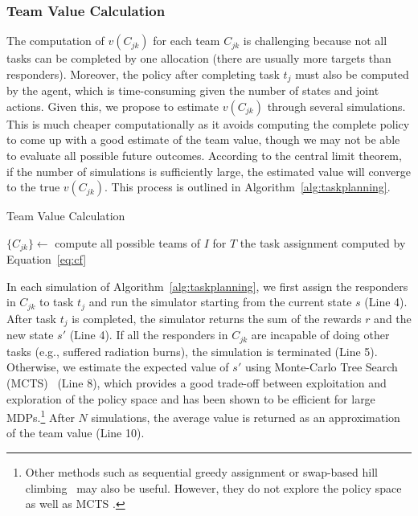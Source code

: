 \subsubsection{Team Value Calculation}
\noindent The computation of  $v(C_{jk})$ for each team
$C_{jk}$ is challenging because not all tasks can be completed by
one allocation (there are usually more targets than responders). Moreover, the policy after completing task $t_j$ must also be computed by the agent, which is time-consuming given the number of states and joint
actions. Given this, we propose to estimate $v(C_{jk})$ through
several simulations. This is much cheaper computationally as it avoids computing the complete policy to come up
with a good estimate of the team value, though we may not be able to
evaluate all possible future outcomes. According to the central
limit theorem, if the number of simulations is sufficiently
large, the estimated value will converge to the true $v(C_{jk})$.
This process is outlined in Algorithm~\ref{alg:taskplanning}.
\begin{algorithm}[htbp]\small
  \caption{Team Value Calculation}
  \label{alg:taskplanning}
  \Indm
  \Indp\BlankLine
  $\{ C_{jk} \} \gets$ compute all possible teams of $I$ for
  $T$ \;
  \Return the task assignment computed by Equation~\ref{eq:cf}
\end{algorithm}

In each simulation of Algorithm~\ref{alg:taskplanning}, we first
assign the responders in $C_{jk}$ to task $t_j$ and run the
simulator starting from the current state $s$ (Line 4). After task
$t_j$ is completed, the simulator returns the sum of the rewards
$r$ and the new state $s'$ (Line 4). If all the responders in
$C_{jk}$ are incapable of doing other tasks (e.g., suffered
radiation burns), the simulation is terminated (Line
5). Otherwise, we estimate the expected value of $s'$ using
Monte-Carlo Tree Search (MCTS)~\cite{kocsis2006bandit} (Line 8),
which provides a good trade-off between exploitation and exploration
of the policy space and has been shown to be efficient for large
MDPs.\footnote{Other methods such as sequential greedy assignment
or swap-based hill climbing~\cite{proper2009solving} may also be useful. However, they do not explore the policy space as well as MCTS \cite{kocsis2006bandit}.} After $N$ simulations, the average value is returned as an approximation of
the team value (Line 10).

